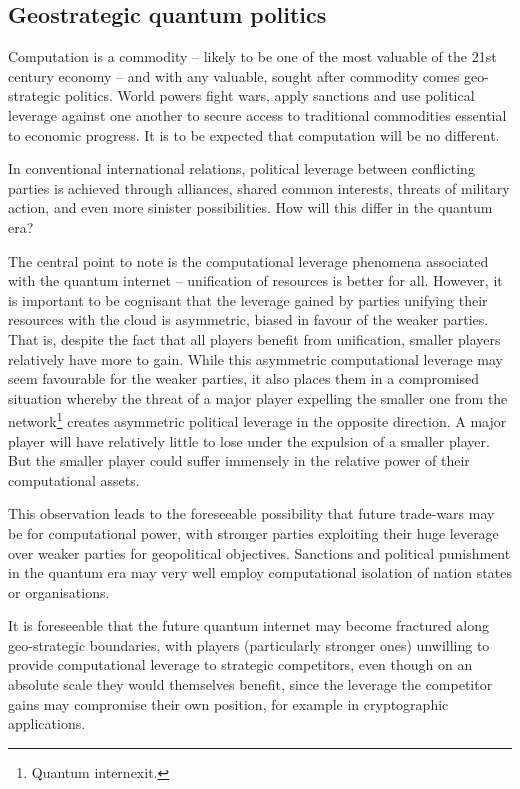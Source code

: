 \subsection{Geostrategic quantum politics}

Computation is a commodity -- likely to be one of the most valuable of the 21st century economy -- and with any valuable, sought after commodity comes geo-strategic politics. World powers fight wars, apply sanctions and use political leverage against one another to secure access to traditional commodities essential to economic progress. It is to be expected that computation will be no different.

In conventional international relations, political leverage between conflicting parties is achieved through alliances, shared common interests, threats of military action, and even more sinister possibilities. How will this differ in the quantum era?

The central point to note is the computational leverage phenomena associated with the quantum internet -- unification of resources is better for all. However, it is important to be cognisant that the leverage gained by parties unifying their resources with the cloud is asymmetric, biased in favour of the weaker parties. That is, despite the fact that all players benefit from unification, smaller players relatively have more to gain. While this asymmetric computational leverage may seem favourable for the weaker parties, it also places them in a compromised situation whereby the threat of a major player expelling the smaller one from the network\footnote{Quantum internexit.} creates asymmetric political leverage in the opposite direction. A major player will have relatively little to lose under the expulsion of a smaller player. But the smaller player could suffer immensely in the relative power of their computational assets.

This observation leads to the foreseeable possibility that future trade-wars may be for computational power, with stronger parties exploiting their huge leverage over weaker parties for geopolitical objectives. Sanctions and political punishment in the quantum era may very well employ computational isolation of nation states or organisations.

It is foreseeable that the future quantum internet may become fractured along geo-strategic boundaries, with players (particularly stronger ones) unwilling to provide computational leverage to strategic competitors, even though on an absolute scale they would themselves benefit, since the leverage the competitor gains may compromise their own position, for example in cryptographic applications.

